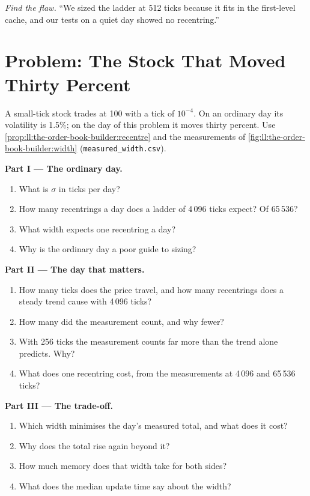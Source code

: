\begin{exercise}[$\star\star\star$]\label{exo:ll:the-order-book-builder:8}
\emph{Find the flaw.} ``We sized the ladder at 512 ticks because it fits in the first-level cache, and our tests on a quiet
day showed no recentring.''
\end{exercise}

\section{Problem: The Stock That Moved Thirty Percent}

\begin{problem}\label{pb:ll:the-order-book-builder:1}
A small-tick stock trades at 100 with a tick of $10^{-4}$. On an ordinary day its volatility is 1.5\%; on the day of this
problem it moves thirty percent. Use \cref{prop:ll:the-order-book-builder:recentre} and the measurements of
\cref{fig:ll:the-order-book-builder:width} (\texttt{measured\_width.csv}).

\medskip\noindent\textbf{Part I --- The ordinary day.}
\begin{enumerate}
\item What is $\sigma$ in ticks per day?
\item How many recentrings a day does a ladder of 4\,096 ticks expect? Of 65\,536?
\item What width expects one recentring a day?
\item Why is the ordinary day a poor guide to sizing?
\end{enumerate}

\medskip\noindent\textbf{Part II --- The day that matters.}
\begin{enumerate}[resume]
\item How many ticks does the price travel, and how many recentrings does a steady trend cause with 4\,096 ticks?
\item How many did the measurement count, and why fewer?
\item With 256 ticks the measurement counts far more than the trend alone predicts. Why?
\item What does one recentring cost, from the measurements at 4\,096 and 65\,536 ticks?
\end{enumerate}

\medskip\noindent\textbf{Part III --- The trade-off.}
\begin{enumerate}[resume]
\item Which width minimises the day's measured total, and what does it cost?
\item Why does the total rise again beyond it?
\item How much memory does that width take for both sides?
\item What does the median update time say about the width?
\end{enumerate}


\end{problem}

